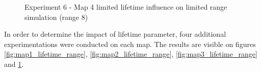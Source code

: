 \begin{figure}[H]
    \centering

    \hspace*{\fill}

    \hspace*{\fill}

    \caption{Experiment 6 - Map 4 limited lifetime influence on limited range simulation (range 8)}\label{fig:map4_lifetime_range}
\end{figure}

In order to determine the impact of lifetime parameter, four additional experimentations were conducted on each map.
The results are visible on figures \ref{fig:map1_lifetime_range}, \ref{fig:map2_lifetime_range}, \ref{fig:map3_lifetime_range} and \ref{fig:map4_lifetime_range}.

